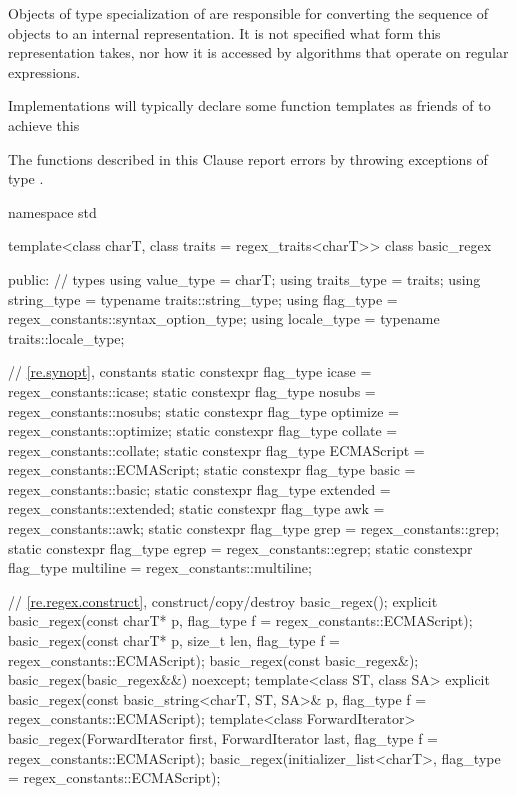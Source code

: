 \pnum
Objects of type specialization of  are responsible for
converting the sequence of  objects to an internal
representation. It is not specified what form this representation
takes, nor how it is accessed by algorithms that operate on regular
expressions. \begin{note} Implementations will typically declare
some function templates as friends of  to achieve
this \end{note}

\pnum
{}%
The functions described in this Clause report errors by throwing
exceptions of type .

%
\begin{codeblock}
namespace std {
  template<class charT, class traits = regex_traits<charT>>
    class basic_regex {
    public:
      // types
      using value_type  =          charT;
      using traits_type =          traits;
      using string_type = typename traits::string_type;
      using flag_type   =          regex_constants::syntax_option_type;
      using locale_type = typename traits::locale_type;

      // \ref{re.synopt}, constants
      static constexpr flag_type icase = regex_constants::icase;
      static constexpr flag_type nosubs = regex_constants::nosubs;
      static constexpr flag_type optimize = regex_constants::optimize;
      static constexpr flag_type collate = regex_constants::collate;
      static constexpr flag_type ECMAScript = regex_constants::ECMAScript;
      static constexpr flag_type basic = regex_constants::basic;
      static constexpr flag_type extended = regex_constants::extended;
      static constexpr flag_type awk = regex_constants::awk;
      static constexpr flag_type grep = regex_constants::grep;
      static constexpr flag_type egrep = regex_constants::egrep;
      static constexpr flag_type multiline = regex_constants::multiline;

      // \ref{re.regex.construct}, construct/copy/destroy
      basic_regex();
      explicit basic_regex(const charT* p, flag_type f = regex_constants::ECMAScript);
      basic_regex(const charT* p, size_t len, flag_type f = regex_constants::ECMAScript);
      basic_regex(const basic_regex&);
      basic_regex(basic_regex&&) noexcept;
      template<class ST, class SA>
        explicit basic_regex(const basic_string<charT, ST, SA>& p,
                             flag_type f = regex_constants::ECMAScript);
      template<class ForwardIterator>
        basic_regex(ForwardIterator first, ForwardIterator last,
                    flag_type f = regex_constants::ECMAScript);
      basic_regex(initializer_list<charT>, flag_type = regex_constants::ECMAScript);

}}
\end{codeblock}

